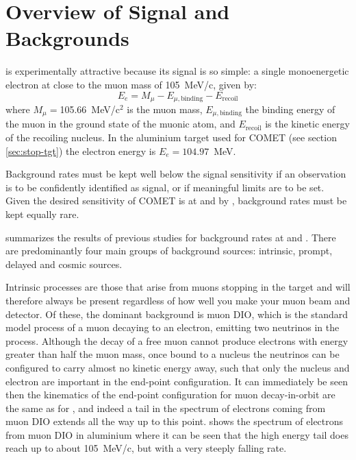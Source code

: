 \section{Overview of Signal and Backgrounds}
\TabBackgroundSummary
\mueconv is experimentally attractive because its signal is so simple: a single monoenergetic electron at close to the muon mass of 105~MeV/c, given by:
\begin{equation}
E_e=M_\mu-E_{\mu,\mathrm{binding}}-E_\mathrm{recoil}
\end{equation}
where $M_\mu=$105.66~MeV/c$^2$ is the muon mass, $E_{\mu,\mathrm{binding}}$ the
binding energy of the muon in the ground state of the muonic atom, and
$E_\mathrm{recoil}$ is the kinetic energy of the recoiling nucleus.
In the aluminium target used for COMET (see section \ref{sec:stop-tgt}) the electron energy is $E_e=104.97$~MeV.

Background rates must be kept well below the signal sensitivity if an observation is to be confidently identified as signal, or if meaningful limits are to be set.
Given the desired sensitivity of COMET is \sensePI  at \phaseI and \sensePII by \phaseII, background rates must be kept equally rare.

 summarizes the results of previous studies for background rates at \phaseI and \phaseII.
There are predominantly four main groups of background sources: intrinsic, prompt, delayed and cosmic sources.

Intrinsic processes are those that arise from muons stopping in the target and will therefore always be present regardless of how well you make your muon beam and detector.
Of these, the dominant background is muon \ac{DIO}, which is the standard model process of a muon decaying to an electron, emitting two neutrinos in the process.
Although the decay of a free muon cannot produce electrons with energy greater than half the muon mass, once bound to a nucleus the neutrinos can be configured to carry almost no kinetic energy away, such that only the nucleus and electron are important in the end-point configuration.
It can immediately be seen then the kinematics of the end-point configuration for muon decay-in-orbit are the same as for \mueconv, and indeed
a tail in the spectrum of electrons coming from muon \ac{DIO} extends all the way up to this point.
 shows the spectrum of electrons from muon \ac{DIO} in aluminium where it can be seen that the high energy tail does reach up to about 105~MeV/c, but with a very steeply falling rate.


